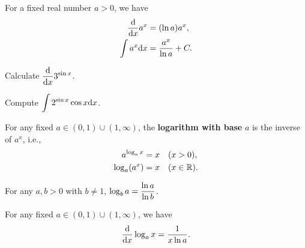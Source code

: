 \begin{theorem}
For a fixed real number $a>0$, we have
\begin{align*}
\frac{\mathrm{d} }{\mathrm{d} x}a^x &= (\ln a) a^x,\\
\int a^x\mathrm{d} x &= \frac{a^x}{\ln a} + C.
\end{align*}
\end{theorem}

\begin{example}
Calculate $\displaystyle\frac{\mathrm{d} }{\mathrm{d} x}3^{\sin x}$.
\end{example}

\vfill

\begin{example}
Compute $\displaystyle\int 2^{\sin x}\cos x\mathrm{d} x$.
\end{example}
\vfill

\newpage

\begin{definition}
For any fixed $a\in (0,1)\cup (1,\infty)$, the \textbf{logarithm with base} $a$ is the inverse of $a^x$, i.e.,
\begin{align*}
a^{\log_a x } &= x \quad (x>0),\\
\log_a(a^x) &= x\quad (x\in\mathbb R).
\end{align*}
\end{definition}

\begin{theorem}
For any $a,b>0$ with $b\ne 1$, $\log_ba = \displaystyle\frac{\ln a}{\ln b}$.
\end{theorem}

\begin{corollary}
For any fixed $a\in (0,1)\cup (1,\infty)$, we have
\begin{equation*}
\frac{\mathrm{d} }{\mathrm{d} x}\log_a x = \frac{1}{x\ln a}.
\end{equation*}
\end{corollary}

